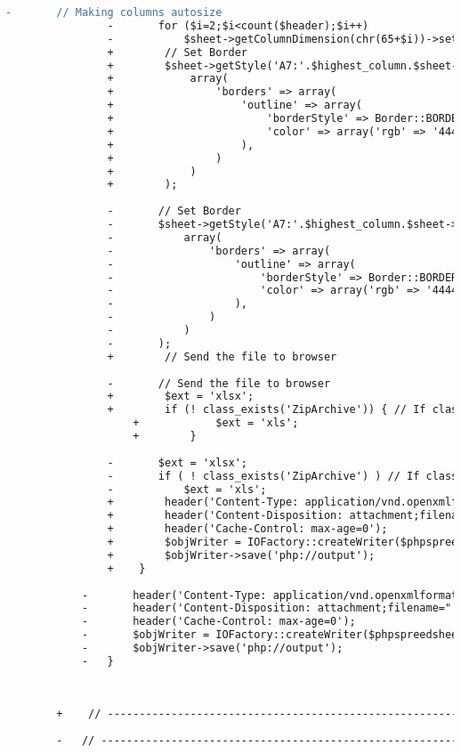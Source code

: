 \begin{lstlisting}[language=diff, caption=Perubahan pada kode Submissions.php]
				-		// Making columns autosize
				-		for ($i=2;$i<count($header);$i++)
				-			$sheet->getColumnDimension(chr(65+$i))->setAutoSize(true);
				+        // Set Border
				+        $sheet->getStyle('A7:'.$highest_column.$sheet->getHighestRow())->applyFromArray(
				+            array(
				+                'borders' => array(
				+                    'outline' => array(
				+                        'borderStyle' => Border::BORDER_THIN,
				+                        'color' => array('rgb' => '444444'),
				+                    ),
				+                )
				+            )
				+        );
				
				-		// Set Border
				-		$sheet->getStyle('A7:'.$highest_column.$sheet->getHighestRow())->applyFromArray(
				-			array(
				-				'borders' => array(
				-					'outline' => array(
				-						'borderStyle' => Border::BORDER_THIN,
				-						'color' => array('rgb' => '444444'),
				-					),
				-				)
				-			)
				-		);
				+        // Send the file to browser
				
				-		// Send the file to browser
				+        $ext = 'xlsx';
				+        if (! class_exists('ZipArchive')) { // If class ZipArchive does not exist, export to excel5 instead of excel 2007
					+            $ext = 'xls';
					+        }
				
				-		$ext = 'xlsx';
				-		if ( ! class_exists('ZipArchive') ) // If class ZipArchive does not exist, export to excel5 instead of excel 2007
				-			$ext = 'xls';
				+        header('Content-Type: application/vnd.openxmlformats-officedocument.spreadsheetml.sheet');
				+        header('Content-Disposition: attachment;filename="'.$output_filename.'.'.$ext.'"');
				+        header('Cache-Control: max-age=0');
				+        $objWriter = IOFactory::createWriter($phpspreedsheet, ucfirst($ext));
				+        $objWriter->save('php://output');
				+    }
			
			-		header('Content-Type: application/vnd.openxmlformats-officedocument.spreadsheetml.sheet');
			-		header('Content-Disposition: attachment;filename="'.$output_filename.'.'.$ext.'"');
			-		header('Cache-Control: max-age=0');
			-		$objWriter = IOFactory::createWriter($phpspreedsheet, ucfirst($ext));
			-		$objWriter->save('php://output');
			-	}
		
		
		
		+    // ------------------------------------------------------------------------
		
		-	// ------------------------------------------------------------------------
		

\end{lstlisting}
